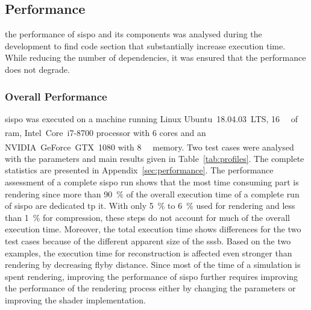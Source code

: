 \subsection{Performance}
the performance of \gls{sispo} and its components was analysed during the development to find code section that substantially increase execution time. While reducing the number of dependencies, it was ensured that the performance does not degrade.

\subsubsection{Overall Performance}
\gls{sispo} was executed on a machine running Linux Ubuntu~18.04.03~LTS, \SI{16}{\giga\byte} of \gls{ram}, Intel\textsuperscript{\textregistered}~Core\texttrademark~i7-8700 processor with \SI{6}{} cores and an NVIDIA\textsuperscript{\textregistered}~GeForce~GTX~1080 with \SI{8}{\giga\byte} memory.
Two test cases were analysed with the parameters and main results given in Table~\ref{tab:profiles}. The complete statistics are presented in Appendix~\ref{sec:performance}. The performance assessment of a complete \gls{sispo} run shows that the most time consuming part is rendering since more than \SI{90}{\percent} of the overall execution time of a complete run of \gls{sispo} are dedicated tp it. With only \SI{5}{\percent} to \SI{6}{\percent} used for rendering and less than \SI{1}{\percent} for compression, these steps do not account for much of the overall execution time. Moreover, the total execution time shows differences for the two test cases because of the different apparent size of the \gls{sssb}. Based on the two examples, the execution time for reconstruction is affected even stronger than rendering by decreasing flyby distance.
Since most of the time of a simulation is spent rendering, improving the performance of \gls{sispo} further requires improving the performance of the rendering process either by changing the parameters or improving the shader implementation.

